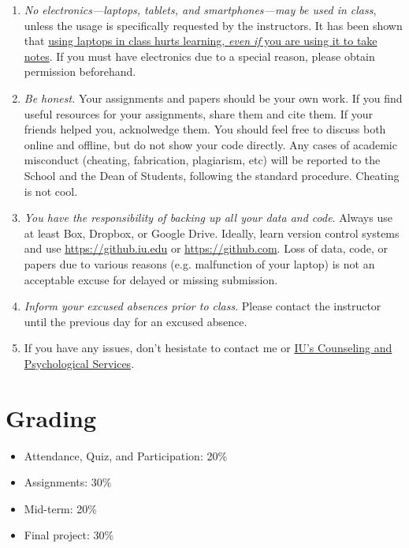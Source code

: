 \documentclass[11pt,article,oneside]{memoir} %
\begin{document}
\begin{enumerate}
\item \emph{No electronics---laptops, tablets, and smartphones---may be used in
class}, unless the usage is specifically requested by the instructors.  It has
been shown that
\href{http://www.scientificamerican.com/article/a-learning-secret-don-t-take-notes-with-a-laptop/}{using
laptops in class hurts learning, \emph{even if} you are using it to take
notes}.  If you must have electronics due to a special reason, please obtain
permission beforehand. 

\item \emph{Be honest.} Your assignments and papers should be your own work.
If you find useful resources for your assignments, share them and cite them. If
your friends helped you, acknolwedge them. You should feel free to discuss both
online and offline, but do not show your code directly.  Any cases of academic
misconduct (cheating, fabrication, plagiarism, etc) will be reported to the
School and the Dean of Students, following the standard procedure. Cheating is
not cool. 

\item \emph{You have the responsibility of backing up all your data and code}.
Always use at least Box, Dropbox, or Google Drive. Ideally, learn version
control systems and use \url{https://github.iu.edu} or
\url{https://github.com}. Loss of data, code, or papers due to various reasons
(e.g. malfunction of your laptop) is not an acceptable excuse for delayed or
missing submission. 

\item \emph{Inform your excused absences prior to class}. Please contact the
instructor until the previous day for an excused absence.  

\item If you have any issues, don't hesistate to contact me or
\href{http://healthcenter.indiana.edu/counseling/index.shtml}{IU's Counseling
and Psychological Services}. 


\end{enumerate}%
\section{Grading}%
\label{sec:grading_tentative_}

\begin{itemize}%

\item Attendance, Quiz, and Participation: 20\%

\item Assignments: 30\%

\item Mid-term: 20\%

\item Final project: 30\%

\end{itemize}%
\clearpage
\end{document}
